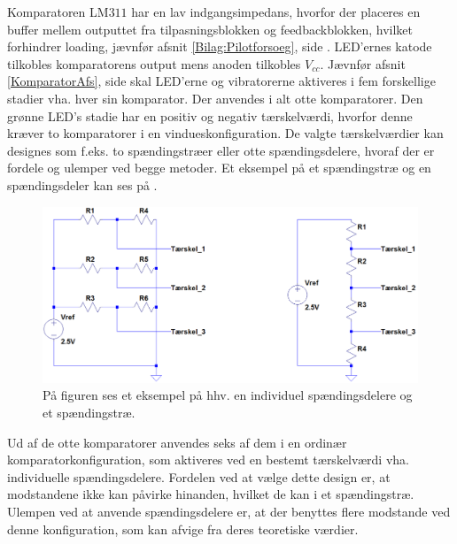 \noindent Komparatoren LM$311$ har en lav indgangsimpedans, hvorfor der placeres en buffer mellem outputtet fra tilpasningsblokken og feedbackblokken, hvilket forhindrer loading, jævnfør afsnit \ref{Bilag:Pilotforsoeg}, side \pageref{Bilag:Pilotforsoeg} \cite{Instruments2015}. LED'ernes katode tilkobles komparatorens output mens anoden tilkobles $V_{cc}$. Jævnfør afsnit \ref{KomparatorAfs}, side \pageref{KomparatorAfs} skal LED'erne og vibratorerne aktiveres i fem forskellige stadier vha. hver sin komparator. Der anvendes i alt otte komparatorer. Den grønne LED's stadie har en positiv og negativ tærskelværdi, hvorfor denne kræver to komparatorer i en vindueskonfiguration. De valgte tærskelværdier kan designes som f.eks. to spændingstræer eller otte spændingsdelere, hvoraf der er fordele og ulemper ved begge metoder. Et eksempel på et spændingstræ og en spændingsdeler kan ses på . 
\begin{figure}[H] 
	\centering
	\includegraphics[scale=0.4]{figures/cProblemloesning/eksempel_speadingstrae.PNG}
	\caption{På figuren ses et eksempel på hhv. en individuel spændingsdelere og et spændingstræ.}
	\label{fig:spaendingstrae}
\end{figure}
\noindent Ud af de otte komparatorer anvendes seks af dem i en ordinær komparatorkonfiguration, som aktiveres ved en bestemt tærskelværdi vha. individuelle spændingsdelere. Fordelen ved at vælge dette design er, at modstandene ikke kan påvirke hinanden, hvilket de kan i et spændingstræ. Ulempen ved at anvende spændingsdelere er, at der benyttes flere modstande ved denne konfiguration, som kan afvige fra deres teoretiske værdier.\\
